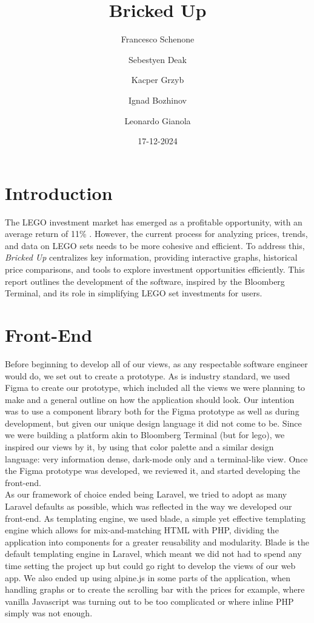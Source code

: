 \documentclass[letterpaper,twocolumn]{article}
\title{Bricked Up}
\author{Francesco Schenone \and Sebestyen Deak \and Kacper Grzyb \and Ignad Bozhinov \and Leonardo Gianola}
\date{17-12-2024}
\begin{document}
\maketitle

\section{Introduction}

The LEGO investment market has emerged as a profitable opportunity, with an average return of 11\% \cite{lego_market}. However, the current process for analyzing prices, trends, and data on LEGO sets needs to be more cohesive and efficient.  
To address this, \textit{Bricked Up} centralizes key information, providing interactive graphs, historical price comparisons, and tools to explore investment opportunities efficiently. This report outlines the development of the software, inspired by the Bloomberg Terminal, and its role in simplifying LEGO set investments for users.


\section{Front-End}

Before beginning to develop all of our views, as any respectable software engineer would do, we set out to create a prototype. 
As is industry standard, we used Figma to create our prototype, which included all the views we were planning to make and a general 
outline on how the application should look. Our intention was to use a component library both for the Figma prototype as well as 
during development, but given our unique design language it did not come to be.
Since we were building a platform akin to Bloomberg Terminal (but for lego), we inspired our views by it, by using that color palette
and a similar design language: very information dense, dark-mode only and a terminal-like view. Once the Figma prototype was developed, 
we reviewed it, and started developing the front-end.
\\

As our framework of choice ended being Laravel, we tried to adopt as many Laravel defaults as possible, which was reflected 
in the way we developed our front-end. 
As templating engine, we used blade, a simple yet effective templating engine which allows for mix-and-matching HTML with PHP, 
dividing the application into components for a greater reusability and modularity. Blade is the default templating engine in Laravel, 
which meant we did not had to spend any time setting the project up but could go right to develop the views of our web app. 
We also ended up using alpine.js \cite{alpinejs} in some parts of the application, when handling graphs or to create the scrolling bar with the prices for example, where vanilla Javascript was turning out to be too complicated
or where inline PHP simply was not enough. 
\end{document}

